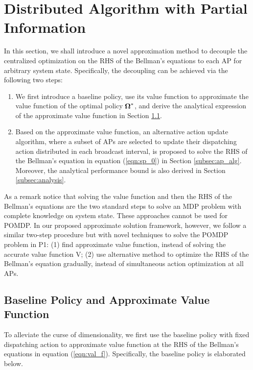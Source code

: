 \section{Distributed Algorithm with Partial Information}
\label{sec:algorithm}

In this section, we shall introduce a novel approximation method to decouple the centralized optimization on the RHS of the Bellman's equations to each AP for arbitrary system state.
Specifically, the decoupling can be achieved via the following two steps:
\begin{enumerate}
    \item We first introduce a baseline policy, use its value function to approximate the value function of the optimal policy $\boldsymbol{\Omega}^*$, and derive the analytical expression of the approximate value function in Section \ref{subsec:baseline}.
    \item Based on the approximate value function, an alternative action update algorithm, where a subset of APs are selected to update their dispatching action distributed in each broadcast interval, is proposed to solve the RHS of the Bellman's equation in equation (\ref{eqn:sp_0}) in Section \ref{subsec:ap_alg}.
    Moreover, the analytical performance bound is also derived in Section \ref{subsec:analysis}.
\end{enumerate}
{As a remark notice that solving the value function and then the RHS of the Bellman's equations are the two standard steps to solve an MDP problem with complete knowledge on system state.
These approaches cannot be used for POMDP.
In our proposed approximate solution framework, however, we follow a similar two-step procedure but with novel techniques to solve the POMDP problem in P1: (1) find approximate value function, instead of solving the accurate value function V; (2) use alternative method to optimize the RHS of the Bellman's equation gradually, instead of simultaneous action optimization at all APs.}

\subsection{Baseline Policy and Approximate Value Function}
\label{subsec:baseline}
To alleviate the curse of dimensionality, we first use the baseline policy with fixed dispatching action to approximate value function at the RHS of the Bellman's equations in equation (\ref{eqn:val_f}).
Specifically, the baseline policy is elaborated below.


